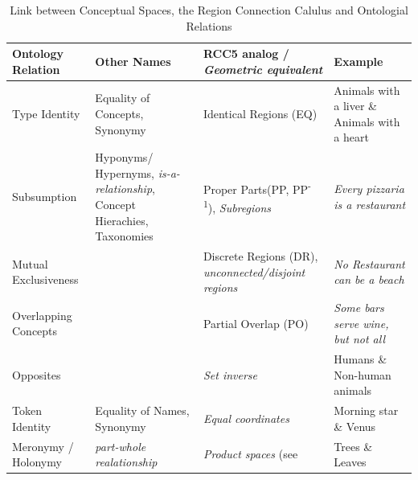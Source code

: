 \vspace{2ex}

\begin{table}[h]
\begin{tabularx}{1.05\textwidth}{P{0.16\textwidth}|P{0.25\textwidth}|P{0.25\textwidth}|X}
    Ontology Relation & Other Names        & RCC5 \cite{Cohn1997a} analog / \textit{Geometric equivalent} & Example \\ \midrule

    Type Identity     & {\scriptsize Equality of Concepts, Synonymy } & Identical Regions (EQ)      & Animals with a liver \& Animals with a heart \\ 

    Subsumption       & {\scriptsize Hyponyms/ Hypernyms, \textit{is-a-relationship}, Concept Hierachies, Taxonomies }
                                           & Proper Parts(PP, PP\textsuperscript{-1}), \textit{Subregions}
                                                                          & \textit{Every pizzaria is a restaurant} \\  
    
    Mutual 
    Exclusiveness     &                    & Discrete Regions (DR), \textit{unconnected/disjoint regions}
                                                                          & \textit{No Restaurant can be a beach} \\  

    Overlapping 
    Concepts          &                    & Partial Overlap (PO)         & \textit{Some bars serve wine, but not all} \\  

    Opposites         &                    & \textit{Set inverse}         & Humans \& Non-human animals \\ 

    Token Identity    & {\scriptsize Equality of Names, Synonymy } & \textit{Equal coordinates}   & Morning star \& Venus \\ 
    Meronymy / Holonymy & {\scriptsize \textit{part-whole realationship} }& \textit{Product spaces} (see \cite{Fiorini2013}        & Trees \& Leaves
\end{tabularx}
\caption[Link between Conceptual Spaces, the RCC and Ontologial Relations]{Link between Conceptual Spaces, the Region Connection Calulus and Ontologial Relations}
\label{tab:rcc_cs}
\end{table}


